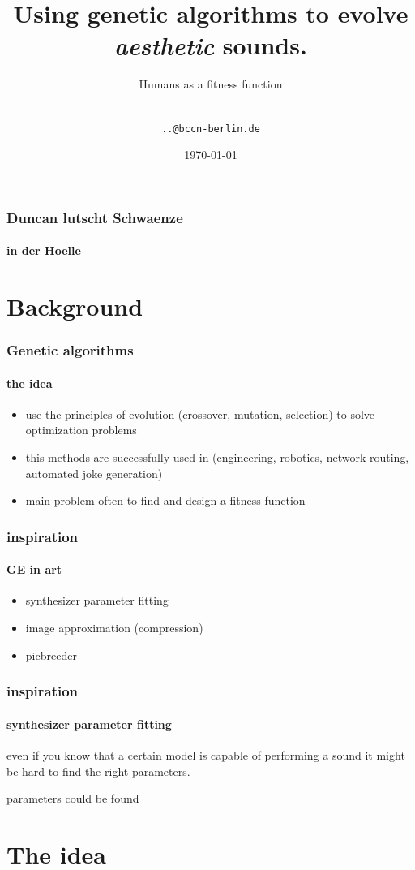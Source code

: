 \documentclass{beamer}
\title[Sound Evolution] {Using genetic algorithms to evolve \emph{aesthetic} sounds.}
\subtitle{Humans as a fitness function}
\author[Duncan, Matthias, Rafael, Mirko \& Stephan] { \\\texttt{..@bccn-berlin.de}}
\date[SS 2010] {\today}
\begin{document}
\frame{\titlepage}

\begin{frame}
	\frametitle{Duncan lutscht Schwaenze}
	\framesubtitle{in der Hoelle}
	
\end{frame}


\section{Background} %
\label{sg:sec:background}

\begin{frame}
	\frametitle{Genetic algorithms}
	\framesubtitle{the idea}
	
	\begin{itemize}
		\item<1-> use the principles of evolution (crossover, mutation, selection)
		to solve optimization problems
		\item<2-> this methods are successfully used in (engineering, robotics, network routing,
		automated joke generation) 
		\item<3-> main problem often to find and design a fitness function
	\end{itemize}
\end{frame}

\begin{frame}
	\frametitle{inspiration}
	\framesubtitle{GE in art}
	
	\begin{itemize}
		\item<1-> synthesizer parameter fitting
		\item<2-> image approximation (compression)
		\item<3-> picbreeder
	\end{itemize}
\end{frame}

\begin{frame}
	\frametitle{inspiration}
	\framesubtitle{synthesizer parameter fitting}

	even if you know that a certain model is capable of performing a sound
	it might be hard to find the right parameters.
	
	parameters could be found
\end{frame}




\section{The idea} %
\label{sg:sec:the_idea}
\end{document}
